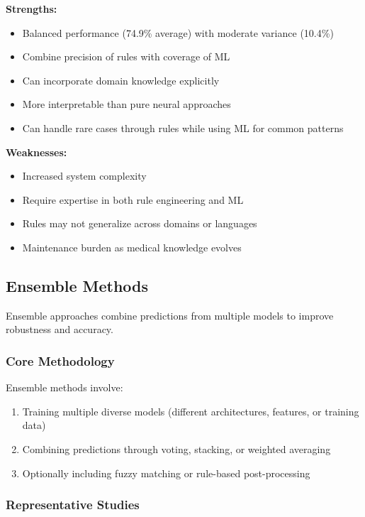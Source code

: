 \textbf{Strengths:}
\begin{itemize}
    \item Balanced performance (74.9\% average) with moderate variance (10.4\%)
    \item Combine precision of rules with coverage of ML
    \item Can incorporate domain knowledge explicitly
    \item More interpretable than pure neural approaches
    \item Can handle rare cases through rules while using ML for common patterns
\end{itemize}

\textbf{Weaknesses:}
\begin{itemize}
    \item Increased system complexity
    \item Require expertise in both rule engineering and ML
    \item Rules may not generalize across domains or languages
    \item Maintenance burden as medical knowledge evolves
\end{itemize}

\subsection{Ensemble Methods}

Ensemble approaches combine predictions from multiple models to improve robustness and accuracy.

\subsubsection{Core Methodology}

Ensemble methods involve:
\begin{enumerate}
    \item Training multiple diverse models (different architectures, features, or training data)
    \item Combining predictions through voting, stacking, or weighted averaging
    \item Optionally including fuzzy matching or rule-based post-processing
\end{enumerate}

\subsubsection{Representative Studies}

